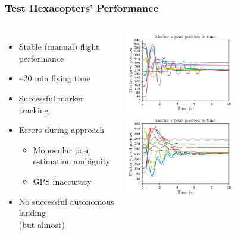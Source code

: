 \documentclass[aspectratio=169]{rubeamer}
\newif\ifpause
\newcommand{\mypause}{\ifpause \pause \fi}
\begin{document}
\begin{frame}
  \frametitle{Test Hexacopters' Performance}
  \begin{columns}
    \begin{itemize}
      \item Stable (manual) flight performance
      \mypause
      \item \textasciitilde 20 min flying time
      \mypause
      \item Successful marker tracking
      \mypause
      \item Errors during approach
      \begin{itemize}
        \item Monocular pose estimation ambiguity
        \mypause
        \item GPS inaccuracy
      \end{itemize}
      \mypause
      \item No successful autonomous landing\\(but almost)
    \end{itemize}
    \centering
    {
    \includegraphics[width=0.6\textwidth]{coral_gimbal_performance_x_axis}\\
    \includegraphics[width=0.6\textwidth]{coral_gimbal_performance_y_axis}\\
    }
  \end{columns}
\end{frame}
\end{document}
